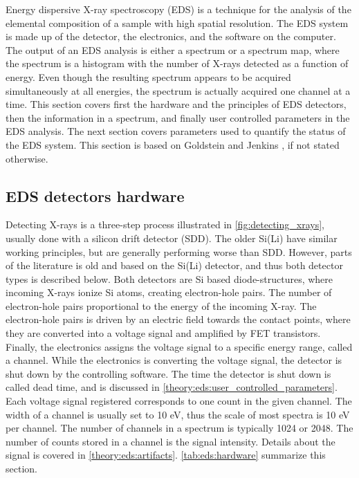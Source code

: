 
Energy dispersive X-ray spectroscopy (EDS) is a technique for the analysis of the elemental composition of a sample with high spatial resolution.
The EDS system is made up of the detector, the electronics, and the software on the computer.
The output of an EDS analysis is either a spectrum or a spectrum map, where the spectrum is a histogram with the number of X-rays detected as a function of energy.
Even though the resulting spectrum appears to be acquired simultaneously at all energies, the spectrum is actually acquired one channel at a time.
This section covers first the hardware and the principles of EDS detectors, then the information in a spectrum, and finally user controlled parameters in the EDS analysis.
The next section covers parameters used to quantify the status of the EDS system. %
This section is based on Goldstein \cite{goldstein_scanning_2018} and Jenkins \cite{jenkins_xrayspectroscopy}, if not stated otherwise.




\subsection{EDS detectors hardware}
\label{theory:eds:hardware}


Detecting X-rays is a three-step process illustrated in \cref{fig:detecting_xrays}, usually done with a silicon drift detector (SDD).
The older Si(Li) have similar working principles, but are generally performing worse than SDD.
However, parts of the literature is old and based on the Si(Li) detector, and thus both detector types is described below.
Both detectors are Si based diode-structures, where incoming X-rays ionize Si atoms, creating electron-hole pairs.
The number of electron-hole pairs proportional to the energy of the incoming X-ray.
The electron-hole pairs is driven by an electric field towards the contact points, where they are converted into a voltage signal and amplified by FET transistors.
Finally, the electronics assigns the voltage signal to a specific energy range, called a channel.
While the electronics is converting the voltage signal, the detector is shut down by the controlling software.
The time the detector is shut down is called dead time, and is discussed in \cref{theory:eds:user_controlled_parameters}.
Each voltage signal registered corresponds to one count in the given channel.
The width of a channel is usually set to 10 eV, thus the scale of most spectra is 10 eV per channel.
The number of channels in a spectrum is typically 1024 or 2048.
The number of counts stored in a channel is the signal intensity.
Details about the signal is covered in \cref{theory:eds:artifacts}.
\cref{tab:eds:hardware} summarize this section.


